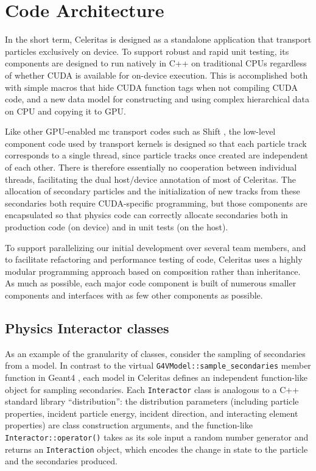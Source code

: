 \section{Code Architecture}\label{code-architecture}

In the short term, Celeritas is designed as a standalone application
that transport particles exclusively on device. To support robust and
rapid unit testing, its components are designed to run natively in C++
on traditional CPUs regardless of whether CUDA is available for
on-device execution. This is accomplished both with simple macros that hide
CUDA function tags when not compiling CUDA code, and a new data model for
constructing and using complex hierarchical data on CPU and copying it to GPU.

Like other GPU-enabled \ac{mc} transport codes such as
Shift \cite{pandya_implementation_2016,hamilton_continuous-energy_2019},
the low-level component code used by transport kernels is designed so
that each particle track corresponds to a single thread, since particle
tracks once created are independent of each other. There is therefore
essentially no cooperation between individual threads, facilitating the
dual host/device annotation of most of Celeritas. The allocation of
secondary particles and the initialization of new tracks from these
secondaries both require CUDA-specific programming, but those components
are encapsulated so that physics code can correctly allocate secondaries both in
production code (on device) and in unit tests (on the host).

To support parallelizing our initial development over several team
members, and to facilitate refactoring and performance testing of code,
Celeritas uses a highly modular programming approach based on
composition rather than inheritance. As much as possible, each major
code component is built of numerous smaller components and interfaces
with as few other components as possible.

\subsection{Physics Interactor classes}

As an example of the granularity of classes, consider the sampling of
secondaries from a model. In contrast to the virtual
\texttt{G4VModel::sample\_secondaries} member function in Geant4 \cite{geant4}, each
model in Celeritas defines an independent function-like object for
sampling secondaries. Each \texttt{Interactor} class is analogous to a C++
standard library ``distribution'': the distribution parameters (including
particle properties, incident particle energy, incident direction, and
interacting element properties)
are class construction arguments, and the function-like
\texttt{Interactor::operator()} takes as its sole input a random number
generator and returns an \texttt{Interaction} object, which encodes the
change in state to the particle and the secondaries produced.

